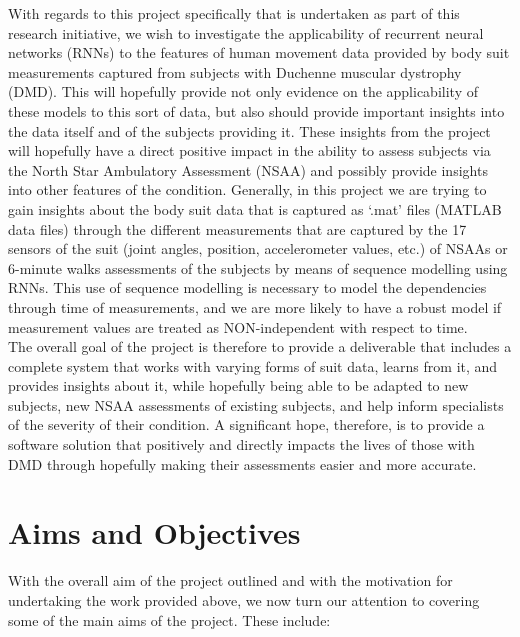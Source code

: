 \documentclass[12pt,twoside]{report}
\begin{document}
\quad With regards to this project specifically that is undertaken as part of this research initiative, we wish to investigate the applicability of recurrent neural networks (RNNs) to the features of human movement data provided by body suit measurements captured from subjects with Duchenne muscular dystrophy (DMD). This will hopefully provide not only evidence on the applicability of these models to this sort of data, but also should provide important insights into the data itself and of the subjects providing it. These insights from the project will hopefully have a direct positive impact in the ability to assess subjects via the North Star Ambulatory Assessment (NSAA) and possibly provide insights into other features of the condition. Generally, in this project we are trying to gain insights about the body suit data that is captured as ‘.mat’ files (MATLAB data files) through the different measurements that are captured by the 17 sensors of the suit (joint angles, position, accelerometer values, etc.) of NSAAs or 6-minute walks assessments of the subjects by means of sequence modelling using RNNs. This use of sequence modelling is necessary to model the dependencies through time of measurements, and we are more likely to have a robust model if measurement values are treated as NON-independent with respect to time.\\

\quad The overall goal of the project is therefore to provide a deliverable that includes a complete system that works with varying forms of suit data, learns from it, and provides insights about it, while hopefully being able to be adapted to new subjects, new NSAA assessments of existing subjects, and help inform specialists of the severity of their condition. A significant hope, therefore, is to provide a software solution that positively and directly impacts the lives of those with DMD through hopefully making their assessments easier and more accurate.

\section{Aims and Objectives}

\quad With the overall aim of the project outlined and with the motivation for undertaking the work provided above, we now turn our attention to covering some of the main aims of the project. These include:\\
\end{document}
